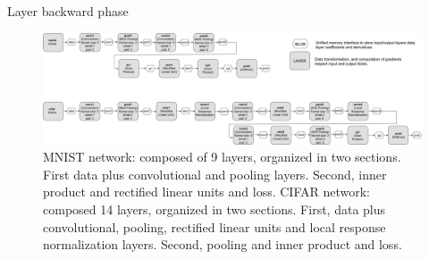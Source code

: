 \setlength{\textfloatsep}{0pt}%
\begin{algorithm}
\small
\caption{Layer backward phase}
\label{alg-back}
\BlankLine
{}
\end{algorithm}
%

\begin{figure}[]
\centering
\includegraphics[width=\linewidth]{figures/mnist-cifar.pdf}
\caption{MNIST network: composed of 9 layers, organized in two sections. First data plus convolutional and pooling layers. Second, inner product and rectified linear units and loss. CIFAR network: composed 14 layers, organized in two sections. First, data plus convolutional, pooling, rectified linear units and local response normalization layers. Second, pooling and inner product and loss.}
\label{fig-mnist-cifar}
\end{figure}

